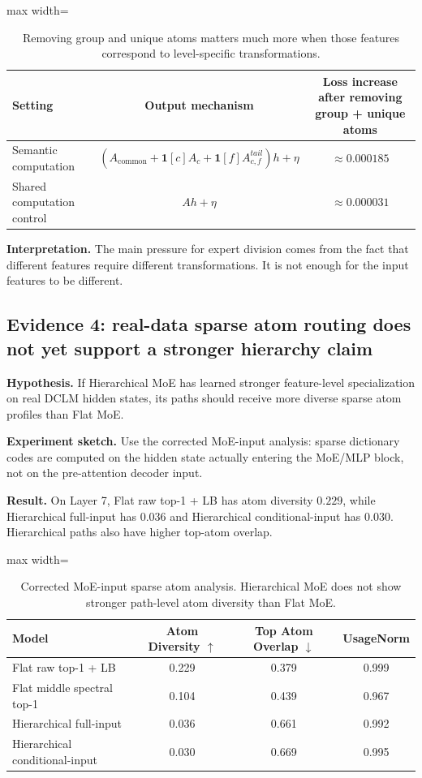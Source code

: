 \documentclass[11pt]{article}
\newcommand{\tablesize}{\footnotesize}
\begin{document}
\begin{table}[H]
\centering
\tablesize
\begin{adjustbox}{max width=\linewidth}
\begin{tabular}{lcc}
\toprule
Setting & Output mechanism & Loss increase after removing group + unique atoms \\
\midrule
Semantic computation & $(A_{\text{common}}+\mathbf{1}[c]A_c+\mathbf{1}[f]A_{c,f}^{tail})h+\eta$ & $\approx 0.000185$ \\
Shared computation control & $Ah+\eta$ & $\approx 0.000031$ \\
\bottomrule
\end{tabular}
\end{adjustbox}
\caption{Removing group and unique atoms matters much more when those features correspond to level-specific transformations.}
\end{table}

\textbf{Interpretation.} The main pressure for expert division comes from the fact that different features require different transformations. It is not enough for the input features to be different.

\subsection{Evidence 4: real-data sparse atom routing does not yet support a stronger hierarchy claim}

\textbf{Hypothesis.} If Hierarchical MoE has learned stronger feature-level specialization on real DCLM hidden states, its paths should receive more diverse sparse atom profiles than Flat MoE.

\textbf{Experiment sketch.} Use the corrected MoE-input analysis: sparse dictionary codes are computed on the hidden state actually entering the MoE/MLP block, not on the pre-attention decoder input.

\textbf{Result.} On Layer 7, Flat raw top-1 + LB has atom diversity $0.229$, while Hierarchical full-input has $0.036$ and Hierarchical conditional-input has $0.030$. Hierarchical paths also have higher top-atom overlap.

\begin{table}[H]
\centering
\tablesize
\begin{adjustbox}{max width=\linewidth}
\begin{tabular}{lccc}
\toprule
Model & Atom Diversity $\uparrow$ & Top Atom Overlap $\downarrow$ & UsageNorm \\
\midrule
Flat raw top-1 + LB & 0.229 & 0.379 & 0.999 \\
Flat middle spectral top-1 & 0.104 & 0.439 & 0.967 \\
Hierarchical full-input & 0.036 & 0.661 & 0.992 \\
Hierarchical conditional-input & 0.030 & 0.669 & 0.995 \\
\bottomrule
\end{tabular}
\end{adjustbox}
\caption{Corrected MoE-input sparse atom analysis. Hierarchical MoE does not show stronger path-level atom diversity than Flat MoE.}
\end{table}
\end{document}
